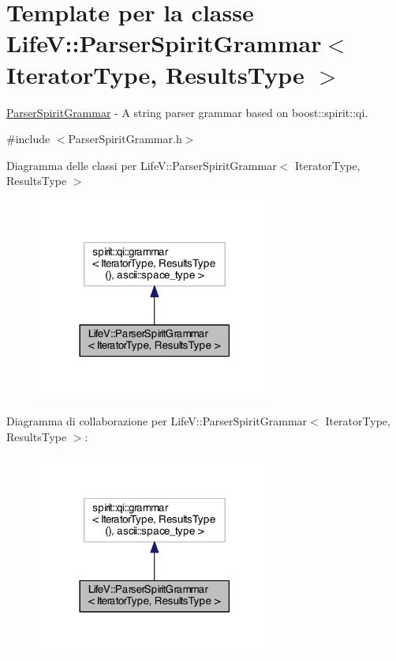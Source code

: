 \hypertarget{classLifeV_1_1ParserSpiritGrammar}{\section{Template per la classe Life\-V\-:\-:Parser\-Spirit\-Grammar$<$ Iterator\-Type, Results\-Type $>$}
\label{classLifeV_1_1ParserSpiritGrammar}
}


\hyperlink{classLifeV_1_1ParserSpiritGrammar}{Parser\-Spirit\-Grammar} -\/ A string parser grammar based on {\ttfamily boost\-::spirit\-::qi}.  




{\ttfamily \#include $<$Parser\-Spirit\-Grammar.\-h$>$}



Diagramma delle classi per Life\-V\-:\-:Parser\-Spirit\-Grammar$<$ Iterator\-Type, Results\-Type $>$\nopagebreak
\begin{figure}[H]
\begin{center}
\leavevmode
\includegraphics[width=222pt]{classLifeV_1_1ParserSpiritGrammar__inherit__graph}
\end{center}
\end{figure}


Diagramma di collaborazione per Life\-V\-:\-:Parser\-Spirit\-Grammar$<$ Iterator\-Type, Results\-Type $>$\-:\nopagebreak
\begin{figure}[H]
\begin{center}
\leavevmode
\includegraphics[width=222pt]{classLifeV_1_1ParserSpiritGrammar__coll__graph}
\end{center}
\end{figure}
